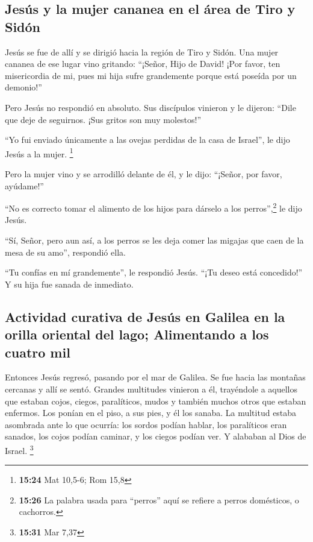 \hypertarget{jesuxfas-y-la-mujer-cananea-en-el-uxe1rea-de-tiro-y-siduxf3n}{%
\subsection{Jesús y la mujer cananea en el área de Tiro y
Sidón}\label{jesuxfas-y-la-mujer-cananea-en-el-uxe1rea-de-tiro-y-siduxf3n}}

 Jesús se fue de allí y se dirigió hacia la región de
Tiro y Sidón.  Una mujer cananea de ese lugar vino
gritando: ``¡Señor, Hijo de David! ¡Por favor, ten misericordia de mi,
pues mi hija sufre grandemente porque está poseída por un demonio!''

 Pero Jesús no respondió en absoluto. Sus discípulos
vinieron y le dijeron: ``Dile que deje de seguirnos. ¡Sus gritos son muy
molestos!''

 ``Yo fui enviado únicamente a las ovejas perdidas de la
casa de Israel'', le dijo Jesús a la mujer. \footnote{\textbf{15:24} Mat
  10,5-6; Rom 15,8}

 Pero la mujer vino y se arrodilló delante de él, y le
dijo: ``¡Señor, por favor, ayúdame!''

 ``No es correcto tomar el alimento de los hijos para
dárselo a los perros'',\footnote{\textbf{15:26} La palabra usada para
  ``perros'' aquí se refiere a perros domésticos, o cachorros.} le dijo
Jesús.

 ``Sí, Señor, pero aun así, a los perros se les deja
comer las migajas que caen de la mesa de su amo'', respondió ella.

 ``Tu confías en mí grandemente'', le respondió Jesús.
``¡Tu deseo está concedido!'' Y su hija fue sanada de inmediato.

\hypertarget{actividad-curativa-de-jesuxfas-en-galilea-en-la-orilla-oriental-del-lago-alimentando-a-los-cuatro-mil}{%
\subsection{Actividad curativa de Jesús en Galilea en la orilla oriental
del lago; Alimentando a los cuatro
mil}\label{actividad-curativa-de-jesuxfas-en-galilea-en-la-orilla-oriental-del-lago-alimentando-a-los-cuatro-mil}}

 Entonces Jesús regresó, pasando por el mar de Galilea.
Se fue hacia las montañas cercanas y allí se sentó. 
Grandes multitudes vinieron a él, trayéndole a aquellos que estaban
cojos, ciegos, paralíticos, mudos y también muchos otros que estaban
enfermos. Los ponían en el piso, a sus pies, y él los sanaba.
 La multitud estaba asombrada ante lo que ocurría: los
sordos podían hablar, los paralíticos eran sanados, los cojos podían
caminar, y los ciegos podían ver. Y alababan al Dios de Israel.
\footnote{\textbf{15:31} Mar 7,37}

